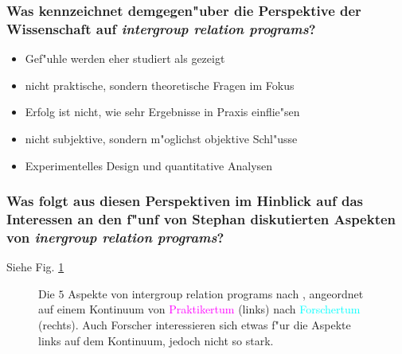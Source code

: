 \subsubsection{Was kennzeichnet demgegen"uber die Perspektive der Wissenschaft auf \emph{intergroup relation programs}?}
\begin{itemize}
        \item Gef"uhle werden eher studiert als gezeigt
        \item nicht praktische, sondern theoretische Fragen im Fokus
        \item Erfolg ist nicht, wie sehr Ergebnisse in Praxis einflie"sen
        \item nicht subjektive, sondern m"oglichst objektive Schl"usse
        \item Experimentelles Design und quantitative Analysen
\end{itemize}

\subsubsection{Was folgt aus diesen Perspektiven im Hinblick auf das Interessen an den f"unf von Stephan diskutierten Aspekten von \emph{inergroup relation programs}?}
Siehe Fig. \ref{fig:stephan1}
\begin{figure}[hb!]
        \begin{center}
        \end{center}
        \caption{Die $5$ Aspekte von intergroup relation programs nach \textcite{stephan_bridging_2006}, angeordnet auf einem Kontinuum von \textcolor{magenta}{Praktikertum} (links) nach \textcolor{cyan}{Forschertum} (rechts). Auch Forscher interessieren sich etwas f"ur die Aspekte links auf dem Kontinuum, jedoch nicht so stark.}
        \label{fig:stephan1}
\end{figure}

